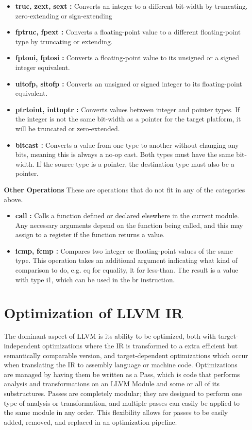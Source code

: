 \documentclass[openany]{book}
\begin{document}
	\begin{itemize}
		\item \textbf{truc, zext, sext : }Converts an integer to a different bit-width by truncating, zero-extending or sign-extending
		\item \textbf{fptruc, fpext : } Converts a floating-point value to a different floating-point type by truncating or extending.
		\item \textbf{fptoui, fptosi : }Converts a floating-point value to its unsigned or a signed integer	equivalent.
		\item \textbf{uitofp, sitofp : } Converts  an  unsigned  or  signed  integer  to  its  floating-point equivalent.
		\item \textbf{ptrtoint, inttoptr : }Converts  values  between  integer  and  pointer  types. If the integer is not the same bit-width as a pointer for the target platform, it will be
		truncated or zero-extended.
		\item \textbf{bitcast : }Converts a value from one type to another without changing any bits,
		meaning this is always a no-op cast. Both types must have the same bit-width. If the source type is a pointer, the destination type must also be a pointer.
	\end{itemize}

	\textbf{Other Operations} \newline \newline
	These are operations that do not fit in any of the categories above.
	
	\begin{itemize}
		\item \textbf{call : }Calls a function defined or declared elsewhere in the current module.  Any necessary arguments depend on the function being called, and this may assign to a register if the function returns a value.
		\item \textbf{icmp, fcmp : }Compares two integer or floating-point values of the same type. This operation takes an additional argument indicating what kind of comparison to do, e.g. eq for equality, lt for less-than. The result is a value with type i1, which can be used in the br instruction.
	\end{itemize}

	\section{Optimization of LLVM IR}
	 The dominant aspect of LLVM is its ability to be optimized, both with target-independent optimizations  where  the  IR  is  transformed  to  a  extra  efficient  but  semantically  comparable version, and target-dependent optimizations which occur when translating the IR to assembly language or machine code. Optimizations are managed by having them be written as a Pass, which is code that performs analysis and transformations on an LLVM Module and some or all of its substructures.  Passes are completely modular; they are designed to perform one type of analysis or transformation, and multiple passes can easily be applied to the same module in any order.  This flexibility allows for passes to be easily added, removed, and replaced in an optimization pipeline.\newline
	 
\end{document}
